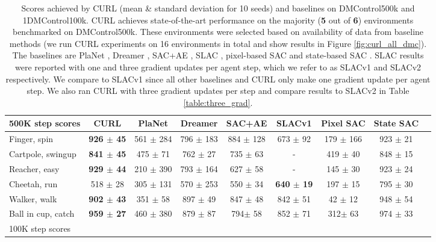 \begin{table}[ht]
\caption{Scores achieved by CURL (mean \& standard deviation for 10 seeds) and baselines on DMControl500k and 1DMControl100k. CURL achieves state-of-the-art performance on the majority (\textbf{5} out of \textbf{6}) environments benchmarked on DMControl500k. These environments were selected based on availability of data from baseline methods (we run CURL experiments on 16 environments in total and show results in Figure \ref{fig:curl_all_dmc}). The baselines are PlaNet \cite{hafner2018learning}, Dreamer \cite{hafner2019dream}, SAC+AE \cite{yarats2019improving}, SLAC \cite{lee2019stochastic}, pixel-based SAC and state-based SAC \cite{haarnoja2018soft}. SLAC results were reported with one and three gradient updates per agent step, which we refer to as SLACv1 and SLACv2 respectively. We compare to SLACv1 since all other baselines and CURL only make one gradient update per agent step. We also ran CURL with three gradient updates per step and compare results to SLACv2 in Table \ref{table:three_grad}.}
\label{table:500kscores}
\vskip 0.15in
\begin{center}
\begin{small}
\begin{sc}
\begin{tabular}{lcccccccc}
\toprule
500K step scores & CURL & PlaNet & Dreamer & SAC+AE & SLACv1 & Pixel SAC &  State SAC \\
\midrule
Finger, spin    & \textbf{ 926 $\pm$ 45} & 561 $\pm$ 284 & 796 $\pm$ 183  & 884 $\pm$ 128 &   673 $\pm$ 92 & 179 $\pm$ 166  & 923 $\pm$ 21 \\
Cartpole, swingup & \textbf{841 $\pm$ 45}& 475 $\pm$ 71& 762 $\pm$ 27 & 735 $\pm$ 63 & - & 419 $\pm$ 40 &  848 $\pm$ 15 \\
Reacher, easy    & \textbf{929 $\pm$ 44}& 210 $\pm$ 390& 793 $\pm$ 164 & 627 $\pm$ 58 & - & 145 $\pm$ 30 &  923 $\pm$ 24 \\
Cheetah, run   & 518 $\pm$ 28 & 305 $\pm$ 131& 570 $\pm$ 253 & 550 $\pm$ 34 &  \textbf{640 $\pm$ 19} & 197 $\pm$ 15 & 795 $\pm$ 30 \\
Walker, walk      & \textbf{902 $\pm$ 43}& 351 $\pm$ 58 & 897 $\pm$ 49 & 847 $\pm$ 48  & 842 $\pm$ 51 & 42 $\pm$ 12 & 948 $\pm$ 54 \\
Ball in cup, catch  & \textbf{959 $\pm$ 27} & 460 $\pm$  380 & 879 $\pm$  87 & 794$\pm$  58  &  852 $\pm$  71 & 312$ \pm$  63 & 974 $\pm$ 33\\
\midrule
100K step scores  &  &  &  &  &  &  &  \\

\end{tabular}
\end{sc}
\end{small}
\end{center}
\end{table}
